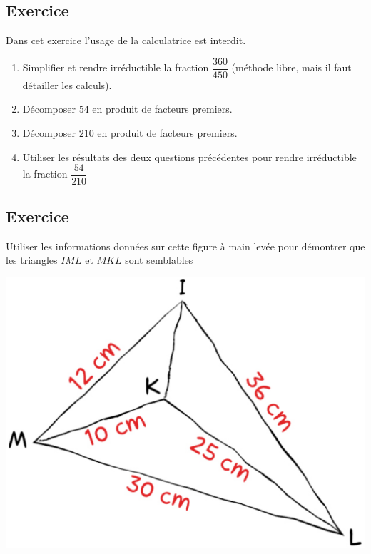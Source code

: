 \documentclass[a4paper,12pt,fleqn]{article}
\newcounter{exo}          				%
\newcommand{\exo}{					%
  	\stepcounter{exo}        			%
  	\subsection*{Exercice \no{}\theexo}}
\begin{document}
\vspace{0.5cm}

\medskip
\begin{minipage}{0.99\linewidth}

\exo

Dans cet exercice l'usage de la calculatrice est interdit.

\begin{enumerate}

\item Simplifier et rendre irréductible la fraction $\dfrac{360}{450}$ (méthode libre, mais il faut détailler les calculs).
\item Décomposer $54$ en produit de facteurs premiers.
\item Décomposer $210$ en produit de facteurs premiers.
\item Utiliser les résultats des deux questions précédentes pour rendre irréductible la fraction $\dfrac{54}{210}$
\end{enumerate}
\end{minipage}

\vspace{0.5cm}

\medskip
\begin{minipage}{0.99\linewidth}

\exo

\begin{multicols}{2}
Utiliser les informations données sur cette figure à main levée pour démontrer que les triangles $IML$ et $MKL$ sont semblables

\begin{center}

\includegraphics[scale=.18]{items/MathsP4C42.eps}

\end{center}

\end{multicols}

\end{minipage}
\end{document}
